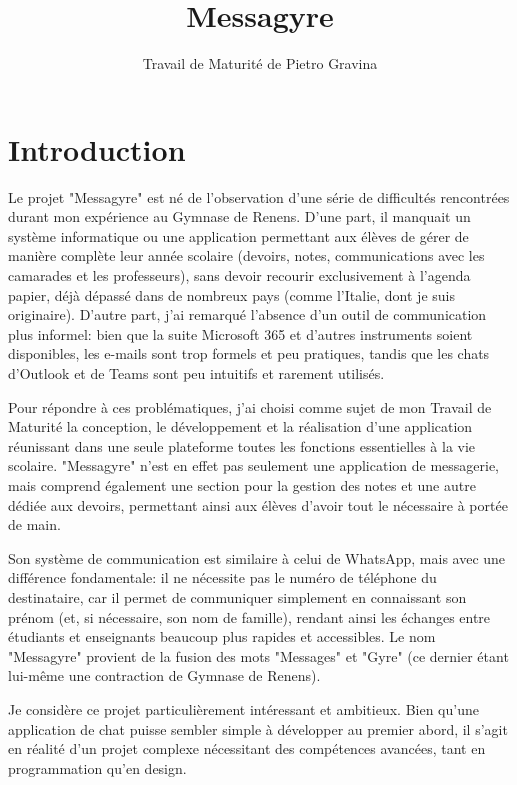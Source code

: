 \documentclass[12pt]{report}
\title{Messagyre}
\author{Travail de Maturité de Pietro Gravina}
\begin{document}
	
	\maketitle
	
	\chapter{Introduction}
	
	Le projet "Messagyre" est né de l’observation d’une série de difficultés rencontrées durant mon expérience au Gymnase de Renens. D’une part, il manquait un système informatique ou une application permettant aux élèves de gérer de manière complète leur année scolaire (devoirs, notes, communications avec les camarades et les professeurs), sans devoir recourir exclusivement à l’agenda papier, déjà dépassé dans de nombreux pays (comme l’Italie, dont je suis originaire). D’autre part, j’ai remarqué l’absence d’un outil de communication plus informel: bien que la suite Microsoft 365 et d’autres instruments soient disponibles, les e-mails sont trop formels et peu pratiques, tandis que les chats d’Outlook et de Teams\supercite{teams} sont peu intuitifs et rarement utilisés.
	
	Pour répondre à ces problématiques, j’ai choisi comme sujet de mon Travail de Maturité la conception, le développement et la réalisation d’une application réunissant dans une seule plateforme toutes les fonctions essentielles à la vie scolaire. "Messagyre" n’est en effet pas seulement une application de messagerie, mais comprend également une section pour la gestion des notes et une autre dédiée aux devoirs, permettant ainsi aux élèves d’avoir tout le nécessaire à portée de main.
	
	Son système de communication est similaire à celui de WhatsApp\supercite{whatsapp}, mais avec une différence fondamentale: il ne nécessite pas le numéro de téléphone du destinataire, car il permet de communiquer simplement en connaissant son prénom (et, si nécessaire, son nom de famille), rendant ainsi les échanges entre étudiants et enseignants beaucoup plus rapides et accessibles. Le nom "Messagyre" provient de la fusion des mots "Messages" et "Gyre" (ce dernier étant lui-même une contraction de Gymnase de Renens).
	
	Je considère ce projet particulièrement intéressant et ambitieux. Bien qu’une application de chat puisse sembler simple à développer au premier abord, il s’agit en réalité d’un projet complexe nécessitant des compétences avancées, tant en programmation qu’en design.
	
\end{document}
